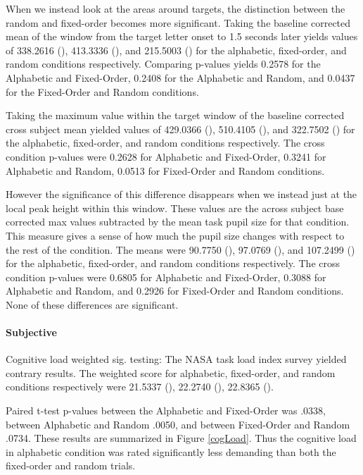 \documentclass[12pt]{article}
\begin{document}
When we instead look at the areas around targets, the distinction
between the random and fixed-order becomes more significant.  Taking
the baseline corrected mean of the window from the target letter
onset to 1.5 seconds later yields values of 338.2616 (),
413.3336 (), and 215.5003 () for the alphabetic,
fixed-order, and random conditions respectively.  Comparing p-values
yields 0.2578 for the Alphabetic and Fixed-Order, 0.2408 for the
Alphabetic and Random, and 0.0437 for the Fixed-Order and Random conditions.

Taking the maximum value within the target window of the baseline
corrected cross subject mean yielded  values of 429.0366 (), 510.4105 (), and 322.7502 () for
the alphabetic, fixed-order, and random conditions respectively.
The cross condition p-values were 0.2628 for Alphabetic and
Fixed-Order, 0.3241 for Alphabetic and Random, 0.0513 for
Fixed-Order and Random conditions.

However the significance of this difference disappears when we
instead just at the local peak height within this window.  These
values are the across subject base corrected max values subtracted
by the mean task pupil size for that condition.  This measure gives
a sense of how much the pupil size changes with respect to the rest
of the condition. The means were 90.7750 (), 97.0769 (), and 107.2499 () for the alphabetic,
fixed-order, and random conditions respectively.  The cross
condition p-values were 0.6805 for Alphabetic and Fixed-Order,
0.3088 for Alphabetic and Random, and 0.2926 for Fixed-Order and
Random conditions.  None of these differences are significant.


\paragraph{Subjective}

Cognitive load weighted sig. testing:
The NASA task load index survey yielded contrary results.  
The weighted score for alphabetic, fixed-order, and random
conditions respectively were 
21.5337 (), 22.2740 (), 22.8365 ().

Paired t-test p-values between the Alphabetic and Fixed-Order was
.0338, between Alphabetic and Random .0050, and between Fixed-Order
and Random .0734.  These results are summarized in Figure
\ref{cogLoad}.  Thus the cognitive load in alphabetic condition was
rated significantly less demanding than both the fixed-order and
random trials.
\end{document}
